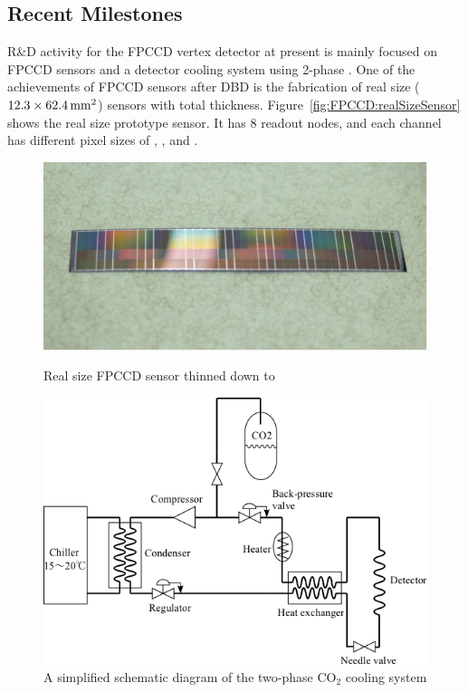 \subsection{Recent Milestones}
R\&D activity for the FPCCD vertex detector at present is mainly focused on FPCCD sensors and a detector cooling system using 2-phase .
One of the achievements of FPCCD sensors after DBD is the fabrication of real size ($12.3 \times \unit[62.4]{\mathrm{mm}^2}$) sensors with \unit[50]{\micron} total thickness. Figure~\ref{fig:FPCCD:realSizeSensor} shows the real size prototype sensor. It has 8 readout nodes, and each channel has different pixel sizes of \unit[12]{\micron}, \unit[8]{\micron}, and \unit[6]{\micron}.
\begin{figure}
 \begin{minipage}[t]{0.49\textwidth}
\centering     \includegraphics*[width=\textwidth,keepaspectratio]{VertexDetector/FPCCD/realSizeFPCCDSensor.png}
    \caption{Real size FPCCD sensor thinned down to \unit[50]{\micron}}
    \label{fig:FPCCD:realSizeSensor}
 \end{minipage}
 \hfill
 \begin{minipage}[t]{0.49\textwidth}
 \centering
    \includegraphics*[width=\textwidth,keepaspectratio]{VertexDetector/FPCCD/coolingSystemSchematic.png}
    \caption{A simplified schematic diagram of the two-phase $\text{CO}_2$ cooling system}
    \label{fig:FPCCD:coolingSystemSchematic}
 \end{minipage}
 \end{figure}

